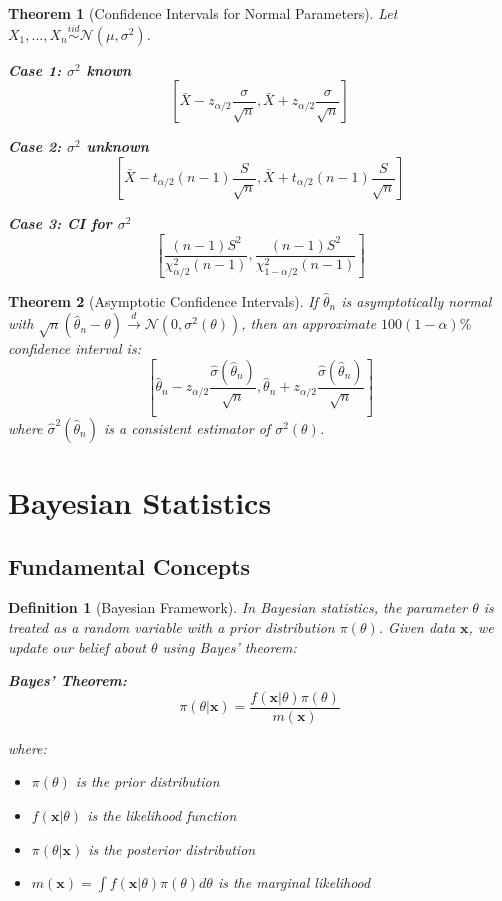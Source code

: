 \documentclass[12pt,a4paper]{article}
\newtheorem{theorem}{Theorem}[section]
\newtheorem{definition}{Definition}[section]
\theoremstyle{remark}
\begin{document}
\begin{theorem}[Confidence Intervals for Normal Parameters]
Let $X_1, \ldots, X_n \stackrel{iid}{\sim} \mathcal{N}(\mu, \sigma^2)$.

\textbf{Case 1: $\sigma^2$ known}
$$\left[\bar{X} - z_{\alpha/2}\frac{\sigma}{\sqrt{n}}, \bar{X} + z_{\alpha/2}\frac{\sigma}{\sqrt{n}}\right]$$

\textbf{Case 2: $\sigma^2$ unknown}
$$\left[\bar{X} - t_{\alpha/2}(n-1)\frac{S}{\sqrt{n}}, \bar{X} + t_{\alpha/2}(n-1)\frac{S}{\sqrt{n}}\right]$$

\textbf{Case 3: CI for $\sigma^2$}
$$\left[\frac{(n-1)S^2}{\chi^2_{\alpha/2}(n-1)}, \frac{(n-1)S^2}{\chi^2_{1-\alpha/2}(n-1)}\right]$$
\end{theorem}

\begin{theorem}[Asymptotic Confidence Intervals]
If $\hat{\theta}_n$ is asymptotically normal with $\sqrt{n}(\hat{\theta}_n - \theta) \stackrel{d}{\to} \mathcal{N}(0, \sigma^2(\theta))$, then an approximate $100(1-\alpha)\%$ confidence interval is:
$$\left[\hat{\theta}_n - z_{\alpha/2}\frac{\hat{\sigma}(\hat{\theta}_n)}{\sqrt{n}}, \hat{\theta}_n + z_{\alpha/2}\frac{\hat{\sigma}(\hat{\theta}_n)}{\sqrt{n}}\right]$$
where $\hat{\sigma}^2(\hat{\theta}_n)$ is a consistent estimator of $\sigma^2(\theta)$.
\end{theorem}

\section{Bayesian Statistics}

\subsection{Fundamental Concepts}

\begin{definition}[Bayesian Framework]
In Bayesian statistics, the parameter $\theta$ is treated as a random variable with a prior distribution $\pi(\theta)$. Given data $\mathbf{x}$, we update our belief about $\theta$ using Bayes' theorem:

\textbf{Bayes' Theorem:}
$$\pi(\theta | \mathbf{x}) = \frac{f(\mathbf{x} | \theta) \pi(\theta)}{m(\mathbf{x})}$$

where:
\begin{itemize}
\item $\pi(\theta)$ is the prior distribution
\item $f(\mathbf{x} | \theta)$ is the likelihood function
\item $\pi(\theta | \mathbf{x})$ is the posterior distribution
\item $m(\mathbf{x}) = \int f(\mathbf{x} | \theta) \pi(\theta) d\theta$ is the marginal likelihood
\end{itemize}
\end{definition}
\end{document}
